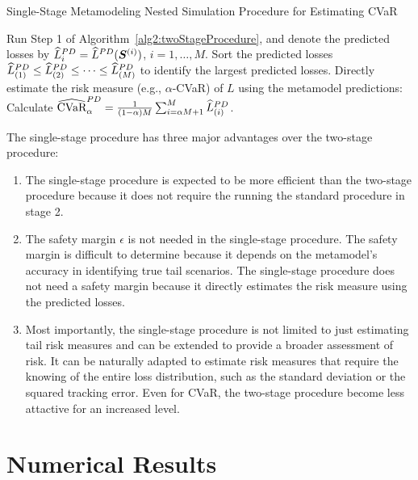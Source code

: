 \begin{algorithm}
\caption{Single-Stage Metamodeling Nested Simulation Procedure for Estimating CVaR}
\begin{algorithmic}[1] \label{alg2:oneStageProcedure}
    \STATE Run Step 1 of Algorithm~\ref{alg2:twoStageProcedure}, and denote the predicted losses by
    $\widehat{L}^{PD}_i = \widehat{L}^{PD}(\bm{S}^{(i)})$, $i=1,\ldots,M$.
    \STATE Sort the predicted losses $\widehat{L}^{PD}_{(1)}\leq \widehat{L}^{PD}_{(2)} \leq \cdots\leq \widehat{L}^{PD}_{(M)}$ to identify the largest predicted losses. 
    \STATE Directly estimate the risk measure (e.g., $\alpha$-CVaR) of $L$ using the metamodel predictions: Calculate $\widehat{\mbox{CVaR}}^{PD}_\alpha = \frac{1}{(1-\alpha)M} \sum_{i=\alpha M + 1}^{M}\widehat{L}^{PD}_{(i)}$.
\end{algorithmic}
\end{algorithm}

The single-stage procedure has three major advantages over the two-stage procedure:
\begin{enumerate}
    \item The single-stage procedure is expected to be more efficient than the two-stage procedure because it does not require the running the standard procedure in stage 2.
    \item The safety margin $\epsilon$ is not needed in the single-stage procedure.
    The safety margin is difficult to determine because it depends on the metamodel's accuracy in identifying true tail scenarios.
    The single-stage procedure does not need a safety margin because it directly estimates the risk measure using the predicted losses.
    \item Most importantly, the single-stage procedure is not limited to just estimating tail risk measures and can be extended to provide a broader assessment of risk. 
    It can be naturally adapted to estimate risk measures that require the knowing of the entire loss distribution, such as the standard deviation or the squared tracking error.
    Even for CVaR, the two-stage procedure become less attactive for an increased level.
\end{enumerate}

\section{Numerical Results} \label{sec2:numerical}

